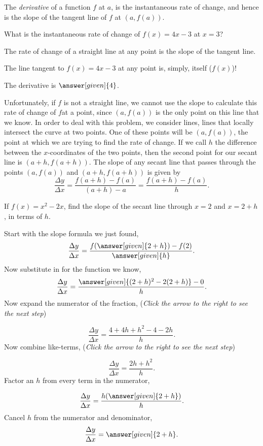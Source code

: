 \documentclass{ximera}
\begin{document}
The \textit{derivative} of a function $f$ at $a$, is the instantaneous
rate of change, and hence is the slope of the tangent line of $f$ at $(a,f(a))$.

\begin{question}
	What is the instantaneous rate of change of $f(x) = 4x-3$ at $x=3$?
	\begin{hint}
		The rate of change  of a straight line at any point is the slope of the tangent line.
        \begin{hint}
	        The line tangent to $f(x) = 4x-3$ at any point is, simply, itself ($f(x)$)!
	    \end{hint}
	\end{hint}

	\begin{prompt}
		The derivative is $\answer[given]{4}$.
	\end{prompt}
\end{question}


Unfortunately, if $f$ is not a straight line, we cannot use the slope
to calculate this rate of change of $f$at a point, since $(a,f(a))$ is the only
point on this line that we know.  In order to deal with this problem,
we consider  lines, lines that locally intersect the curve
at two points.  One of these points will be $(a, f(a))$, the point at
which we are trying to find the rate of change.  If we call $h$ the
difference between the $x$-coordinates of the two points, then the
second point for our secant line is $(a+h, f(a+h))$.  The slope of any
secant line that passes through the points $(a,f(a))$ and $(a+h,
f(a+h))$ is given by
\[
\frac{\Delta y}{\Delta x}=\frac{f(a+h) - f(a)}{(a+h) - a} =
\frac{f(a+h)-f(a)}{h}.
\]

\begin{example}
  If $f(x) = x^2-2x$, find the slope of the secant line through $x=2$ and $x=2+h$, in terms of $h$.
  \begin{explanation}
    Start with the slope formula we just found,
    \[
    \frac{\Delta y}{\Delta x} = \frac{f(\answer[given]{2+h})-f(2)}{\answer[given]{h}}.
    \]
    Now substitute in for the function we know,
    \[
    \frac{\Delta y}{\Delta x} = \frac{\answer[given]{(2+h)^2-2(2+h)} -0}{h}.
    \]
    Now expand the numerator of the fraction, {\color{blue}(\emph{Click the arrow to the right to see the next step})}
    \begin{expandable}
    \[
    \frac{\Delta y}{\Delta x} = \frac{4+4h+h^2-4-2h }{h}.
    \]
    Now combine like-terms, {\color{blue}(\emph{Click the arrow to the right to see the next step})}
    \begin{expandable}
    \[
    \frac{\Delta y}{\Delta x} = \frac{2h+h^2}{h}.
    \]
    Factor an $h$ from every term in the numerator,
    \end{expandable}
    \end{expandable}
    \[
    \frac{\Delta y}{\Delta x} = \frac{h(\answer[given]{2+h})}{h}.
    \]
    Cancel $h$ from the numerator and denominator,
    \[
    \frac{\Delta y}{\Delta x} = \answer[given]{2+h}. 
    \]
  \end{explanation}
\end{example}
\end{document}
